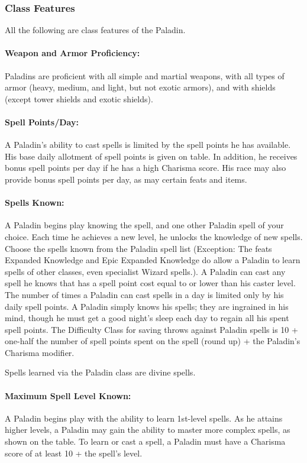 \subsubsection{Class Features}
All the following are class features of the Paladin.

\paragraph{Weapon and Armor Proficiency:} 
Paladins are proficient with all simple and martial weapons, 
with all types of armor (heavy, medium, and light, but not exotic armors),
and with shields (except tower shields and exotic shields).

\paragraph{Spell Points/Day:} A Paladin's ability to cast spells is limited by the spell points he has available. 
His base daily allotment of spell points is given on  table. 
In addition, he receives bonus spell points per day if he has a high Charisma score.
His race may also provide bonus spell points per day, as may certain feats and items.

\paragraph{Spells Known:} A Paladin begins play knowing the  spell, and one other Paladin spell of your choice. 
Each time he achieves a new level, he unlocks the knowledge of new spells.
Choose the spells known from the Paladin spell list
(Exception: The feats Expanded Knowledge and Epic Expanded Knowledge do allow a Paladin to learn spells of other classes, even specialist Wizard spells.).
A Paladin can cast any spell he knows that has a spell point cost equal to or lower than his caster level.
The number of times a Paladin can cast spells in a day is limited only by his daily spell points. 
A Paladin simply knows his spells; they are ingrained in his mind, though he must get a good night's sleep each day to regain all his spent spell points.
The Difficulty Class for saving throws against Paladin spells is 10 + one-half the number of spell points spent on the spell (round up) + the Paladin's Charisma modifier. 

Spells learned via the Paladin class are divine spells.
\paragraph{Maximum Spell Level Known:} A Paladin begins play with the ability to learn 1st-level spells. 
As he attains higher levels, a Paladin may gain the ability to master more complex spells, as shown on the  table.
To learn or cast a spell, a Paladin must have a Charisma score of at least 10 + the spell's level.

